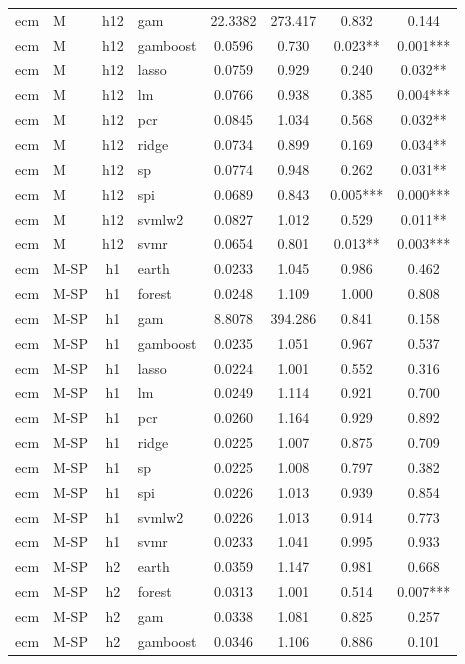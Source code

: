 \begin{ThreePartTable}
\begin{longtable}[t]{llclcccc}
ecm & M & h12 & gam & 22.3382 & 273.417 & 0.832 & 0.144\\
ecm & M & h12 & gamboost & 0.0596 & 0.730 & 0.023** & 0.001***\\
ecm & M & h12 & lasso & 0.0759 & 0.929 & 0.240 & 0.032**\\
ecm & M & h12 & lm & 0.0766 & 0.938 & 0.385 & 0.004***\\
ecm & M & h12 & pcr & 0.0845 & 1.034 & 0.568 & 0.032**\\
ecm & M & h12 & ridge & 0.0734 & 0.899 & 0.169 & 0.034**\\
ecm & M & h12 & sp & 0.0774 & 0.948 & 0.262 & 0.031**\\
ecm & M & h12 & spi & 0.0689 & 0.843 & 0.005*** & 0.000***\\
ecm & M & h12 & svmlw2 & 0.0827 & 1.012 & 0.529 & 0.011**\\
ecm & M & h12 & svmr & 0.0654 & 0.801 & 0.013** & 0.003***\\
\addlinespace
ecm & M-SP & h1 & earth & 0.0233 & 1.045 & 0.986 & 0.462\\
ecm & M-SP & h1 & forest & 0.0248 & 1.109 & 1.000 & 0.808\\
ecm & M-SP & h1 & gam & 8.8078 & 394.286 & 0.841 & 0.158\\
ecm & M-SP & h1 & gamboost & 0.0235 & 1.051 & 0.967 & 0.537\\
ecm & M-SP & h1 & lasso & 0.0224 & 1.001 & 0.552 & 0.316\\
ecm & M-SP & h1 & lm & 0.0249 & 1.114 & 0.921 & 0.700\\
ecm & M-SP & h1 & pcr & 0.0260 & 1.164 & 0.929 & 0.892\\
ecm & M-SP & h1 & ridge & 0.0225 & 1.007 & 0.875 & 0.709\\
ecm & M-SP & h1 & sp & 0.0225 & 1.008 & 0.797 & 0.382\\
ecm & M-SP & h1 & spi & 0.0226 & 1.013 & 0.939 & 0.854\\
ecm & M-SP & h1 & svmlw2 & 0.0226 & 1.013 & 0.914 & 0.773\\
ecm & M-SP & h1 & svmr & 0.0233 & 1.041 & 0.995 & 0.933\\
\addlinespace
ecm & M-SP & h2 & earth & 0.0359 & 1.147 & 0.981 & 0.668\\
ecm & M-SP & h2 & forest & 0.0313 & 1.001 & 0.514 & 0.007***\\
ecm & M-SP & h2 & gam & 0.0338 & 1.081 & 0.825 & 0.257\\
ecm & M-SP & h2 & gamboost & 0.0346 & 1.106 & 0.886 & 0.101\\

\end{longtable}
\end{ThreePartTable}
